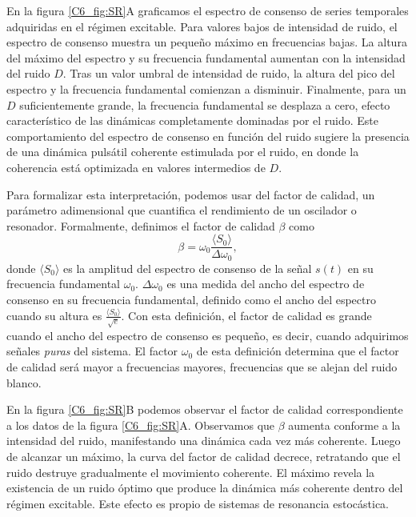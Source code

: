 \documentclass[./main.tex]{subfiles}
\begin{document}
En la figura \ref{C6_fig:SR}A graficamos el espectro de consenso de series temporales adquiridas en el régimen excitable. Para valores bajos de intensidad de ruido, el espectro de consenso muestra un pequeño máximo en frecuencias bajas. La altura del máximo del espectro y su frecuencia fundamental aumentan con la intensidad del ruido $D$. Tras un valor umbral de intensidad de ruido, la altura del pico del espectro y la frecuencia fundamental comienzan a disminuir. Finalmente, para un $D$ suficientemente grande, la frecuencia fundamental se desplaza a cero, efecto característico de las dinámicas completamente dominadas por el ruido. Este comportamiento del espectro de consenso en función del ruido sugiere la presencia de una dinámica pulsátil coherente estimulada por el ruido, en donde la coherencia está optimizada  en valores intermedios de $D$. 


Para formalizar esta interpretación, podemos usar del factor de calidad, un parámetro adimensional que cuantifica el rendimiento de un oscilador o resonador. Formalmente, definimos el factor de calidad $\beta$ como \cite{Ditzinger1994}
\begin{equation}
    \beta = \omega_0 \frac{\langle S_0 \rangle}{\Delta  \omega_0},
    \label{C6_eq:QF}
\end{equation}
donde $\langle S_0 \rangle$ es la amplitud del espectro de consenso de la señal $s(t)$ en su frecuencia fundamental $\omega_0$. $\Delta  \omega_0$ es una medida del ancho del espectro de consenso en su frecuencia fundamental, definido como el ancho del espectro cuando su altura es $\frac{\langle S_0 \rangle}{\sqrt{e}}$. Con esta definición, el factor de calidad es grande cuando el ancho del espectro de consenso es pequeño, es decir, cuando adquirimos señales \emph{puras} del sistema.  El factor $\omega_0$ de esta definición determina que el factor de calidad será mayor a frecuencias mayores, frecuencias que se alejan del ruido blanco. 


En la figura  \ref{C6_fig:SR}B podemos observar el factor de calidad correspondiente a los datos de la figura \ref{C6_fig:SR}A. Observamos que $\beta$ aumenta conforme a la intensidad del ruido, manifestando una dinámica cada vez más coherente. Luego de alcanzar un máximo, la curva del factor de calidad decrece, retratando que el ruido destruye gradualmente el movimiento coherente. El máximo revela la existencia de un ruido óptimo que produce la dinámica más coherente dentro del régimen excitable. Este efecto es propio de sistemas de resonancia estocástica. 
\end{document}
